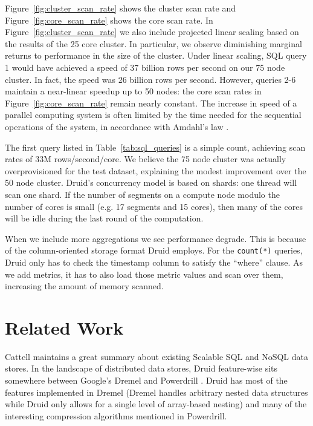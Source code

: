 \documentclass{vldb}
\begin{document}
Figure~\ref{fig:cluster_scan_rate} shows the cluster scan rate and
Figure~\ref{fig:core_scan_rate} shows the core scan rate.  In
Figure~\ref{fig:cluster_scan_rate} we also include projected linear
scaling based on the results of the 25 core cluster.  In particular,
we observe diminishing marginal returns to performance in the size of
the cluster.  Under linear scaling, SQL query 1 would have achieved a
speed of 37 billion rows per second on our 75 node cluster.  In fact,
the speed was 26 billion rows per second.  However, queries 2-6 maintain
a near-linear speedup up to 50 nodes: the core scan rates in
Figure~\ref{fig:core_scan_rate} remain nearly constant.
The increase in speed of a parallel
computing system is often limited by the time needed for the
sequential operations of the system, in accordance with Amdahl's law
\cite{amdahl1967validity}.

The first query listed in Table~\ref{tab:sql_queries} is a simple
count, achieving scan rates of 33M rows/second/core. We believe
the 75 node cluster was actually overprovisioned for the test
dataset, explaining the modest improvement over the 50 node cluster.
Druid's concurrency model is based on shards: one thread will scan one
shard. If the number of segments on a compute node modulo the number
of cores is small (e.g. 17 segments and 15 cores), then many of the
cores will be idle during the last round of the computation.

When we include more aggregations we see performance degrade.  This is
because of the column-oriented storage format Druid employs.  For the
\texttt{count(*)} queries, Druid only has to check the timestamp column to satisfy
the ``where'' clause.  As we add metrics, it has to also load those metric
values and scan over them, increasing the amount of memory scanned.

\section{Related Work}
\label{sec:related}
Cattell \cite{cattell2011scalable} maintains a great summary about existing Scalable SQL and
NoSQL data stores. In the landscape of distributed data stores, Druid
feature-wise sits somewhere between Google’s Dremel \cite{melnik2010dremel} and Powerdrill
\cite{hall2012processing}. Druid has most of the features implemented in Dremel (Dremel
handles arbitrary nested data structures while Druid only allows for a
single level of array-based nesting) and many of the interesting
compression algorithms mentioned in Powerdrill.
\end{document}
